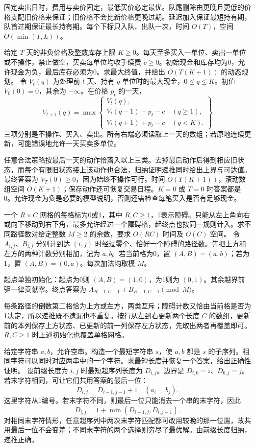 固定卖出日时，费用与卖价固定，最低买价必定最优。队尾删除由更晚且更低的价格支配旧价格来保证；旧价格不会比新价格更晚过期。延迟加入保证最短持有期，队首过期保证最长持有期。每个下标只入队、出队一次，时间 $O(T)$，空间 $O(\min(T,L))$。

给定 $T$ 天的非负价格及整数库存上限 $K\ge0$。每天至多买入一单位、卖出一单位或不操作，禁止做空，买卖每单位均收手续费 $c\ge0$。初始现金和库存均为0，允许现金为负，最后库存必须为0。求最大终值，并给出 $O(T(K+1))$ 的动态规划。
\solution 令 $V_t(q)$ 为处理前 $t$ 天、持有 $q$ 单位时的最大现金，$0\le q\le K$。初值 $V_0(0)=0$，其余为 $-\infty$。在价格 $p_t$ 的一天，
\[
V_{t+1}(q)=\max\left\{
\begin{array}{l}
V_t(q),\\
V_t(q-1)-p_t-c\quad(q\ge1),\\
V_t(q+1)+p_t-c\quad(q<K).
\end{array}\right\}
\]
三项分别是不操作、买入、卖出。所有右端必须读取上一天的数组；若原地连续更新，可能错误地允许一天买卖多单位。

任意合法策略按最后一天的动作恰落入以上三类。去掉最后动作后得到相应旧状态，而每个有限旧状态接上该动作也合法，归纳证明递推同时给出上界与可达值。最终答案为 $V_T(0)\ge0$，因为始终不操作可行。时间 $O(T(K+1))$，滚动数组空间 $O(K+1)$；保存动作还可恢复交易日程。$K=0$ 或 $T=0$ 时答案都是0。允许现金为负是必要的模型说明，否则还需检查每笔买入是否有足够现金。

一个 $R\times C$ 网格的每格标为0或1，其中 $R,C\ge1$，1表示障碍。只能从左上角向右或向下移动到右下角，最多允许经过一个障碍格，起终点也按同一规则计入。求不同路径数对给定整数 $M\ge2$ 的余数，要求 $O(RC)$ 时间及 $O(C)$ 空间。
\solution 令 $A_{i,j}$、$B_{i,j}$ 分别计到达 $(i,j)$ 时经过零个、恰好一个障碍的路径数。先把上方和左方的两种计数分别相加，记为 $a,b$。若当前格为0，置 $(A,B)=(a,b)$；若为1，置 $(A,B)=(0,a)$。每次加法均取模 $M$。

起点单独初始化：起点为0则 $(A,B)=(1,0)$，为1则为 $(0,1)$。其余越界前驱一律贡献零。终点答案为 $A_{R-1,C-1}+B_{R-1,C-1}\pmod M$。

每条路径的倒数第二格恰为上方或左方，两类互斥；障碍计数又恰由当前格是否为1决定，所以递推既不遗漏也不重复。按行从左到右更新两个长度 $C$ 的数组，更新前的本列保存上方状态、已更新的前一列保存左方状态，先取出两者再覆盖即可。$R,C\ge1$ 时上述初始化也覆盖单格网格。

给定字符串 $a,b$，允许空串。构造一个最短字符串 $s$，使 $a,b$ 都是 $s$ 的子序列。相同字符可以同时对应两串中的一个字符。求最短长度并恢复一个答案，给出正确性证明。
\solution 设前缀长度为 $i,j$ 时最短超序列长度为 $D_{i,j}$。边界是 $D_{i,0}=i$、$D_{0,j}=j$。若末字符相同，可让它们共用答案的最后一位：
\[
D_{i,j}=D_{i-1,j-1}+1\quad(a_i=b_j).
\]
这里字符从1编号。若末字符不同，则最后一位只能消去一个串的末字符，因此
\[
D_{i,j}=1+\min(D_{i-1,j},D_{i,j-1}).
\]
对相同末字符情形，任意超序列中两次末字符匹配都可改用较晚的那一位置，故共用最后一位不会变差；不同末字符的两个选择则穷尽了最优解。由前缀长度归纳，递推正确。

